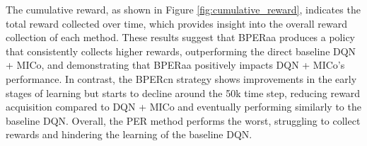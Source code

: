 The cumulative reward, as shown in Figure \ref{fig:cumulative_reward}, indicates the total reward collected over time, which provides insight into the overall reward collection of each method. These results suggest that BPERaa produces a policy that consistently collects higher rewards, outperforming the direct baseline DQN + MICo, and demonstrating that BPERaa positively impacts DQN + MICo's performance. In contrast, the BPERcn strategy shows improvements in the early stages of learning but starts to decline around the 50k time step, reducing reward acquisition compared to DQN + MICo and eventually performing similarly to the baseline DQN. Overall, the PER method performs the worst, struggling to collect rewards and hindering the learning of the baseline DQN.


